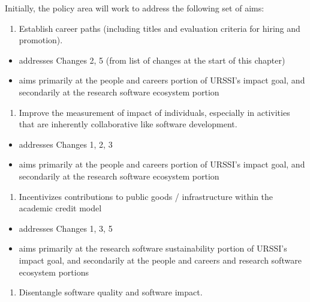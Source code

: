 \documentclass[
]{book}
\providecommand{\tightlist}{%
  \setlength{\itemsep}{0pt}\setlength{\parskip}{0pt}}
\begin{document}
Initially, the policy area will work to address the following set of aims:

\begin{enumerate}
\def\labelenumi{\arabic{enumi}.}
\tightlist
\item
  Establish career paths (including titles and evaluation criteria for hiring and promotion).
\end{enumerate}

\begin{itemize}
\tightlist
\item
  addresses Changes 2, 5 (from list of changes at the start of this chapter)
\item
  aims primarily at the people and careers portion of URSSI's impact goal, and secondarily at the research software ecosystem portion
\end{itemize}

\begin{enumerate}
\def\labelenumi{\arabic{enumi}.}
\setcounter{enumi}{1}
\tightlist
\item
  Improve the measurement of impact of individuals, especially in activities that are inherently
  collaborative like software development.
\end{enumerate}

\begin{itemize}
\tightlist
\item
  addresses Changes 1, 2, 3
\item
  aims primarily at the people and careers portion of URSSI's impact goal, and secondarily at the research software ecosystem portion
\end{itemize}

\begin{enumerate}
\def\labelenumi{\arabic{enumi}.}
\setcounter{enumi}{2}
\tightlist
\item
  Incentivizes contributions to public goods / infrastructure within the academic credit model
\end{enumerate}

\begin{itemize}
\tightlist
\item
  addresses Changes 1, 3, 5
\item
  aims primarily at the research software sustainability portion of URSSI's impact goal, and secondarily at the people and careers and research software ecosystem portions
\end{itemize}

\begin{enumerate}
\def\labelenumi{\arabic{enumi}.}
\setcounter{enumi}{3}
\tightlist
\item
  Disentangle software quality and software impact.
\end{enumerate}
\end{document}
